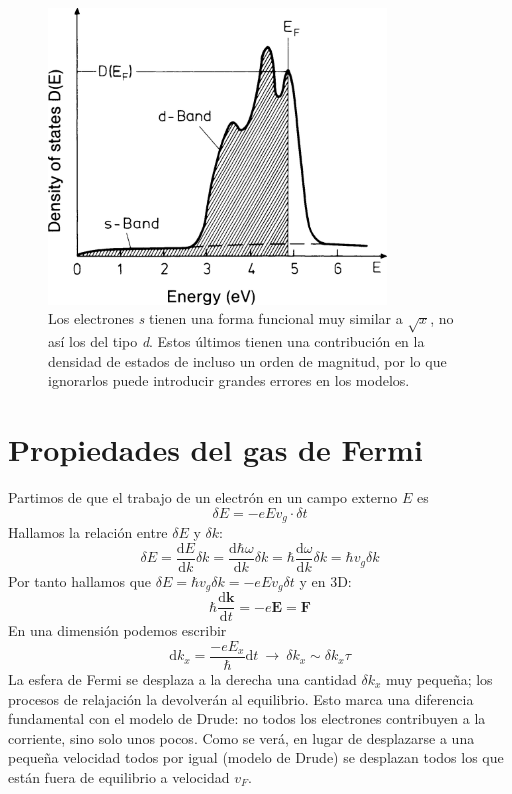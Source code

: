 \begin{figure}
  \centering
  \includegraphics[width=0.8\textwidth]{figures/spdf.png}
  \caption{Los electrones \emph{s} tienen una forma funcional muy
    similar a $\sqrt x$, no así los del tipo \emph{d}. Estos últimos
    tienen una contribución en la densidad de estados de incluso un orden
  de magnitud, por lo que ignorarlos puede introducir grandes errores
  en los modelos.}
  \label{fig:spdf}
\end{figure}

\section{Propiedades del gas de Fermi}
\label{sec:fermiprop}
Partimos de que el trabajo de un electrón en un campo externo $E$ es
\begin{equation}
  \delta E = -e E v_g \cdot \delta t
\end{equation}
Hallamos la relación entre $\delta E$ y $\delta k$:
\begin{equation}
  \delta E = \frac{\text{d}E}{\text{d}k}\delta k =
  \frac{\text{d}\hbar\omega}{\text{d}k} \delta k = \hbar
  \frac{\text{d}\omega}{\text{d}k}\delta k = \hbar v_g \delta k
\end{equation}
Por tanto hallamos que $\delta E = \hbar v_g \delta k = -e E v_g
\delta t$ y en 3D:
\begin{equation}
  \hbar \frac{\text{d}\mathbf{k}}{\text{d}t} = -e \mathbf{E} = \mathbf{F}
\end{equation}
En una dimensión podemos escribir
\begin{equation}
  \text{d} k_x = \frac{-e E_x}{\hbar} \text{d}t \ \rightarrow \ \delta
  k_x  \sim \delta k_x \tau
\end{equation}
La esfera de Fermi se desplaza a la derecha una cantidad $\delta k_x$
muy pequeña; los procesos de relajación la devolverán al
equilibrio. Esto marca una diferencia fundamental con el modelo de
Drude: no todos los electrones contribuyen a la corriente, sino solo
unos pocos. Como se verá, en lugar de desplazarse a una pequeña
velocidad todos por igual (modelo de Drude) se desplazan todos los que
están fuera de equilibrio a velocidad $v_F$.

